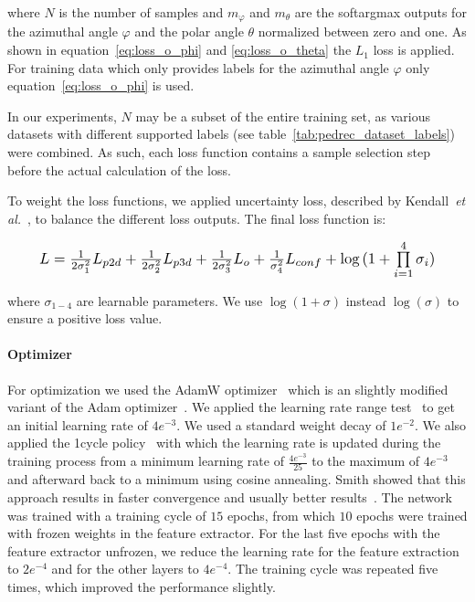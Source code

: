 \documentclass[a4paper, 10pt, conference]{ieeeconf}
\begin{document}
where $N$ is the number of samples and $m_{\varphi}$ and $m_{\theta}$ are the softargmax outputs for the azimuthal angle $\varphi$ and the polar angle $\theta$ normalized between zero and one. As shown in equation~\ref{eq:loss_o_phi} and \ref{eq:loss_o_theta} the $L_1$ loss is applied. For training data which only provides labels for the azimuthal angle $\varphi$ only equation~\ref{eq:loss_o_phi} is used. 

In our experiments, $N$ may be a subset of the entire training set, as various datasets with different supported labels (see table~\ref{tab:pedrec_dataset_labels}) were combined. As such, each loss function contains a sample selection step before the actual calculation of the loss.

To weight the loss functions, we applied uncertainty loss, described by Kendall~\textit{et al.}~\cite{kendallMultitaskLearningUsing2018}, to balance the different loss outputs. The final loss function is:

\begin{equation}
  \resizebox{0.9\columnwidth}{!}{$L = \frac{1}{2\sigma_1^2} L_{p2d} + \frac{1}{2\sigma_2^2} L_{p3d} + \frac{1}{2\sigma_3^2} L_{o} + \frac{1}{\sigma_4^2} L_{conf} + \log{(1+ \prod\limits_{i=1}^{4}\sigma_i)}$}
\end{equation}

where $\sigma_{1-4}$ are learnable parameters. We use $\log{(1+\sigma)}$ instead $\log{(\sigma)}$ to ensure a positive loss value.

\paragraph{Optimizer}
For optimization we used the AdamW optimizer~\cite{loshchilovDecoupledWeightDecay2019} which is an slightly modified variant of the Adam optimizer~\cite{kingmaAdamMethodStochastic2015}. We applied the learning rate range test~\cite{smithCyclicalLearningRates2017a} to get an initial learning rate of $4e^{-3}$. We used a standard weight decay of $1e^{-2}$. We also applied the 1cycle policy~\cite{smithDisciplinedApproachNeural2018} with which the learning rate is updated during the training process from a minimum learning rate of $\frac{4e^{-3}}{25}$ to the maximum of $4e^{-3}$ and afterward back to a minimum using cosine annealing. Smith showed that this approach results in faster convergence and usually better results~\cite{smithCyclicalLearningRates2017a}. The network was trained with a training cycle of $15$ epochs, from which $10$ epochs were trained with frozen weights in the feature extractor. For the last five epochs with the feature extractor unfrozen, we reduce the learning rate for the feature extraction to $2e^{-4}$ and for the other layers to $4e^{-4}$. The training cycle was repeated five times, which improved the performance slightly.
\end{document}

